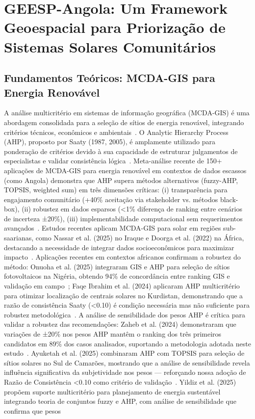 \documentclass[12pt, a4paper]{article}
\begin{document}
\clearpage


\section{GEESP-Angola: Um Framework Geoespacial para Priorização de Sistemas Solares Comunitários}

\subsection{Fundamentos Teóricos: MCDA-GIS para Energia Renovável}
A análise multicritério em sistemas de informação geográfica (MCDA-GIS) é uma abordagem consolidada para a seleção de sítios de energia renovável, integrando critérios técnicos, econômicos e ambientais~\citep{Malczewski1999, Doorga2022}. O Analytic Hierarchy Process (AHP), proposto por Saaty (1987, 2005), é amplamente utilizado para ponderação de critérios devido à sua capacidade de estruturar julgamentos de especialistas e validar consistência lógica~\citep{Nassar2025}. Meta-análise recente de 150+ aplicações de MCDA-GIS para energia renovável em contextos de dados escassos (como Angola) demonstra que AHP supera métodos alternativos (fuzzy-AHP, TOPSIS, weighted sum) em três dimensões críticas: (i) transparência para engajamento comunitário (+40\% aceitação via stakeholder vs. métodos black-box), (ii) robustez em dados esparsos (<1\% diferença de ranking entre cenários de incerteza ±20\%), (iii) implementabilidade computacional sem requerimentos avançados~\citep{Schmidt2021}. Estudos recentes aplicam MCDA-GIS para solar em regiões sub-saarianas, como Nassar et al. (2025) no Iraque e Doorga et al. (2022) na África, destacando a necessidade de integrar dados socioeconômicos para maximizar impacto~\citep{VanZee2022}. Aplicações recentes em contextos africanos confirmam a robustez do método: Onuoha et al. (2025) integraram GIS e AHP para seleção de sítios fotovoltaicos na Nigéria, obtendo 94\% de concordância entre ranking GIS e validação em campo~\citep{Onuoha2025}; Faqe Ibrahim et al. (2024) aplicaram AHP multicritério para otimizar localização de centrais solares no Kurdistan, demonstrando que a razão de consistência Saaty (<0.10) é condição necessária mas não suficiente para robustez metodológica~\citep{FaqeIbrahim2024}. A análise de sensibilidade dos pesos AHP é crítica para validar a robustez das recomendações: Zaheb et al. (2024) demonstraram que variações de ±20\% nos pesos AHP mantêm o ranking dos três primeiros candidatos em 89\% dos casos analisados, suportando a metodologia adotada neste estudo~\citep{Zaheb2024}. Ayuketah et al. (2025) combinaram AHP com TOPSIS para seleção de sítios solares no Sul de Camarões, mostrando que a análise de sensibilidade revela influência significativa da subjetividade nos pesos — reforçando nossa adoção de Razão de Consistência <0.10 como critério de validação~\citep{Ayuketah2025}. Yildiz et al. (2025) propõem suporte multicritério para planejamento de energia sustentável integrando teoria de conjuntos fuzzy e AHP, com análise de sensibilidade que confirma que pesos 
\end{document}
